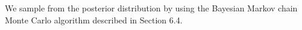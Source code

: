 We sample from the posterior distribution by using the Bayesian Markov chain Monte Carlo algorithm described in Section 6.4.
